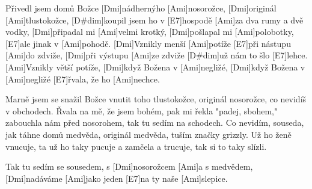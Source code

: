 
\sloka
[Ami]Přivedl jsem domů Božce [Dmi]nádhernýho [Ami]nosorožce,
[Dmi]originál [Ami]tlustokožce, [D#dim]koupil jsem ho v [E7]hospodě
[Ami]za dva rumy a dvě vodky, [Dmi]připadal mi [Ami]velmi krotký,
[Dmi]pošlapal mi [Ami]polobotky, [E7]ale jinak v [Ami]pohodě.
[Dmi]Vznikly menší [Ami]potíže [E7]při nástupu [Ami]do zdviže,
[Dmi]při výstupu [Ami]ze zdviže [D#dim]už nám to šlo [E7]lehce.
[Ami]Vznikly větší potíže, [Dmi]když Božena v [Ami]negližé,
[Dmi]když Božena v [Ami]negližé [E7]řvala, že ho [Ami]nechce.

\sloka
Marně jsem se snažil Božce vnutit toho tlustokožce,
originál nosorožce, co nevidíš v obchodech.
Řvala na mě, že jsem bohém, pak mi řekla "padej, sbohem,"
zabouchla nám před nosorohem, tak tu sedím na schodech.
Co nevidím, souseda, jak táhne domů medvěda,
originál medvěda, tuším značky grizzly.
Už ho ženě vnucuje, ta už ho taky pucuje
a zamčela a trucuje, tak si to taky slízli.

\hvezda
[Ami]Tak tu sedím se sousedem, s [Dmi]nosorožcem [Ami]a s medvědem,
[Dmi]nadáváme [Ami]jako jeden [E7]na ty naše [Ami]slepice.
